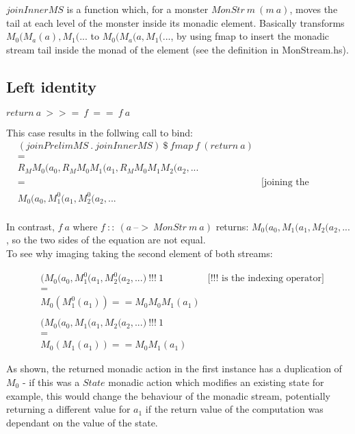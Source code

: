 \documentclass{article}
\begin{document}
$ joinInnerMS $ is a function which, for a monster $MonStr\ m\ (m\ a)$, moves the tail at each level of the monster inside its monadic element. Basically transforms $M_0(M_a(a),M_1(...$ to $M_0(M_a(a, M_1(... $, by using fmap to insert the monadic stream tail inside the monad of the element (see the definition in MonStream.hs).

\subsection{Left identity}
$return\ a\ >>=\ f\ ==\ f\ a$

This case results in the follwing call to bind:\\
\begin{align*}
&(joinPrelimMS\ .\ joinInnerMS)\ \$\ fmap\ f\ (return\ a) \\
&=\\
&R_MM_0 ( a_0, R_MM_0M_1 (a_1, R_MM_0M_1M_2 (a_2, ...\\
&= &\text{[joining the monadic actions]}\\
&M_0 ( a_0, M^0_1 ( a_1, M^0_2 ( a_2, ... \\
\end{align*}

In contrast, $ f\ a $ where $ f\ ::\ (a\ –>\ MonStr\ m\ a) $ returns: $M_0 (a_0, M_1 (a_1, M_2 (a_2, ...$, so the two sides of the equation are not equal.\\
To see why imaging taking the second element of both streams:

 \begin{align*}
 & \big(M_0 ( a_0, M^0_1 ( a_1, M^0_2 ( a_2, ... \big)\ !!!\ 1 & \text{[$!!!$ is the indexing operator]}\\
 &=\\
 & M_0 (M^0_1 ( a_1 )) == M_0M_0M_1 ( a_1 )\\
 & \\
 & \big(M_0 (a_0, M_1 (a_1, M_2 (a_2, ... \big)\ !!! \ 1\\
 & =\\
 & M_0 (M_1 ( a_1 )) == M_0M_1 ( a_1 )
 \end{align*}
 
 As shown, the returned monadic action in the first instance has a duplication of $M_0$ - if this was a $State$ monadic action which modifies an existing state for example, this would change the behaviour of the monadic stream, potentially returning a different value for $ a_1 $ if the return value of the computation was dependant on the value of the state.
\end{document}
